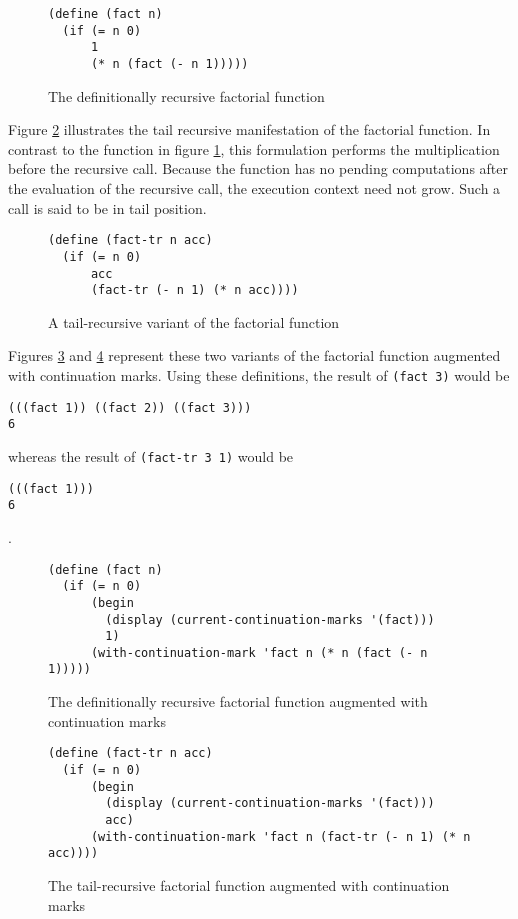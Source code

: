 \documentclass[ms]{byuprop}
\newcounter{definition}
\begin{document}
\begin{figure}
\begin{verbatim}
(define (fact n)
  (if (= n 0)
      1
      (* n (fact (- n 1)))))
\end{verbatim}
\caption{The definitionally recursive factorial function}
\label{fac-rec}
\end{figure}

Figure \ref{fac-tail-rec} illustrates the tail recursive manifestation of the factorial
function. In contrast to the function in figure \ref{fac-rec}, this formulation performs
the multiplication before the recursive call. Because the function has no pending
computations after the evaluation of the recursive call, the execution context need not
grow. Such a call is said to be in tail position.

\begin{figure}
\begin{verbatim}
(define (fact-tr n acc)
  (if (= n 0)
      acc
      (fact-tr (- n 1) (* n acc))))
\end{verbatim}
\caption{A tail-recursive variant of the factorial function}
\label{fac-tail-rec}
\end{figure}

Figures \ref{fac-rec-cm} and \ref{fac-tail-rec-cm} represent these two variants of the
factorial function augmented with continuation marks. Using these definitions, the 
result of \texttt{(fact 3)} would be

\begin{verbatim}
(((fact 1)) ((fact 2)) ((fact 3)))
6
\end{verbatim}

whereas the result of \texttt{(fact-tr 3 1)} would be

\begin{verbatim}
(((fact 1)))
6
\end{verbatim}.

\begin{figure}
\begin{verbatim}
(define (fact n)
  (if (= n 0)
      (begin
        (display (current-continuation-marks '(fact)))
        1)
      (with-continuation-mark 'fact n (* n (fact (- n 1)))))
\end{verbatim}
\caption{The definitionally recursive factorial function augmented with continuation marks}
\label{fac-rec-cm}
\end{figure}

\begin{figure}
\begin{verbatim}
(define (fact-tr n acc)
  (if (= n 0)
      (begin
        (display (current-continuation-marks '(fact)))
        acc)
      (with-continuation-mark 'fact n (fact-tr (- n 1) (* n acc))))
\end{verbatim}
\caption{The tail-recursive factorial function augmented with continuation marks}
\label{fac-tail-rec-cm}
\end{figure}
\end{document}
